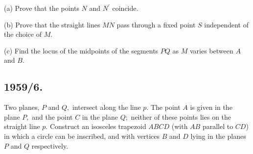 \documentclass[12pt,thmsa]{article}
\begin{document}
(a) Prove that the points $N$ and $N^{\prime }$ coincide.

(b) Prove that the straight lines $MN$ pass through a fixed point $S$
independent of the choice of $M.$

(c) Find the locus of the midpoints of the segments $PQ$ as $M$ varies
between $A$ and $B.$

\subsection{1959/6.}

Two planes, $P$ and $Q,$ intersect along the line $p.$ The point $A$ is
given in the plane $P,$ and the point $C$ in the plane $Q;$ neither of these
points lies on the straight line $p.$ Construct an isosceles trapezoid $ABCD$
(with $AB$ parallel to $CD$) in which a circle can be inscribed, and with
vertices $B$ and $D$ lying in the planes $P$ and $Q$ respectively.
\end{document}
